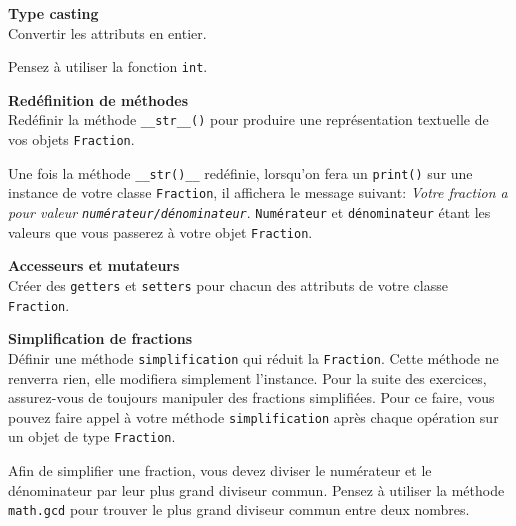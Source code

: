 \begin{Exercice}[5 minutes] \textbf{Type casting}\\
	Convertir les attributs en entier.
	\begin{conseil}
		Pensez à utiliser la fonction \lstinline{int}.
	\end{conseil}
\end{Exercice}

\begin{Exercice}[5 minutes] \textbf{Redéfinition de méthodes} \\
	Redéfinir la méthode \lstinline{__str__()} pour produire une représentation textuelle de vos objets \lstinline{Fraction}.
	\begin{conseil}
		Une fois la méthode \lstinline{__str()__} redéfinie, lorsqu'on fera un \lstinline{print()} sur une instance de votre classe \lstinline{Fraction}, il affichera le message suivant: \textit{Votre fraction a pour valeur \lstinline{numérateur/dénominateur}}. \lstinline{Numérateur} et \lstinline{dénominateur} étant les valeurs que vous passerez à votre objet \lstinline{Fraction}.
	\end{conseil}
\end{Exercice}

\begin{Exercice} [5 minutes] \textbf{Accesseurs et mutateurs} \\
	Créer des \lstinline{getters} et \lstinline{setters} pour chacun des attributs de votre classe \lstinline{Fraction}.
\end{Exercice}

\begin{Exercice} [10 minutes] \textbf{Simplification de fractions}\\
	Définir une méthode \lstinline{simplification} qui réduit la \lstinline{Fraction}. Cette méthode ne renverra rien, elle modifiera simplement l'instance. Pour la suite des exercices, assurez-vous de toujours manipuler des fractions simplifiées. Pour ce faire, vous pouvez faire appel à votre méthode \lstinline{simplification} après chaque opération sur un objet de type \lstinline{Fraction}.

	\begin{conseil}
		Afin de simplifier une fraction, vous devez diviser le numérateur et le dénominateur par leur plus grand diviseur commun. Pensez à utiliser la méthode \lstinline{math.gcd} pour trouver le plus grand diviseur commun entre deux nombres.
	\end{conseil}
\end{Exercice}

